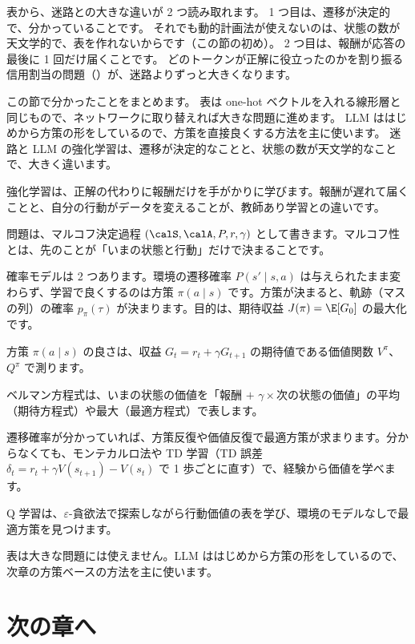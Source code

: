 表から、迷路との大きな違いが 2 つ読み取れます。
1 つ目は、遷移が決定的で、分かっていることです。
それでも動的計画法が使えないのは、状態の数が天文学的で、表を作れないからです（この節の初め）。
2 つ目は、報酬が応答の最後に 1 回だけ届くことです。
どのトークンが正解に役立ったのかを割り振る信用割当の問題（）が、迷路よりずっと大きくなります。

この節で分かったことをまとめます。
表は one-hot ベクトルを入れる線形層と同じもので、ネットワークに取り替えれば大きな問題に進めます。
LLM ははじめから方策の形をしているので、方策を直接良くする方法を主に使います。
迷路と LLM の強化学習は、遷移が決定的なことと、状態の数が天文学的なことで、大きく違います。

\begin{summary}
\item 強化学習は、正解の代わりに報酬だけを手がかりに学びます。報酬が遅れて届くことと、自分の行動がデータを変えることが、教師あり学習との違いです。
\item 問題は、マルコフ決定過程 $(\calS,\calA,P,r,\gamma)$ として書きます。マルコフ性とは、先のことが「いまの状態と行動」だけで決まることです。
\item 確率モデルは 2 つあります。環境の遷移確率 $P(s'\mid s,a)$ は与えられたまま変わらず、学習で良くするのは方策 $\pi(a\mid s)$ です。方策が決まると、軌跡（マスの列）の確率 $p_\pi(\tau)$ が決まります。目的は、期待収益 $J(\pi)=\E[G_0]$ の最大化です。
\item 方策 $\pi(a\mid s)$ の良さは、収益 $G_t=r_t+\gamma G_{t+1}$ の期待値である価値関数 $V^\pi$、$Q^\pi$ で測ります。
\item ベルマン方程式は、いまの状態の価値を「報酬 $+$ $\gamma\times$次の状態の価値」の平均（期待方程式）や最大（最適方程式）で表します。
\item 遷移確率が分かっていれば、方策反復や価値反復で最適方策が求まります。分からなくても、モンテカルロ法や TD 学習（TD 誤差 $\delta_t=r_t+\gamma V(s_{t+1})-V(s_t)$ で 1 歩ごとに直す）で、経験から価値を学べます。
\item Q 学習は、$\varepsilon$-貪欲法で探索しながら行動価値の表を学び、環境のモデルなしで最適方策を見つけます。
\item 表は大きな問題には使えません。LLM ははじめから方策の形をしているので、次章の方策ベースの方法を主に使います。
\end{summary}

\section*{次の章へ}

